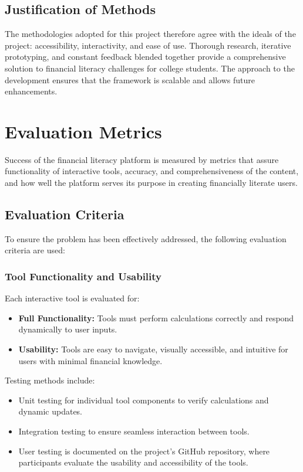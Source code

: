 \documentclass[11pt,twocolumn]{article}
\begin{document}
\subsection{Justification of Methods}
The methodologies adopted for this project therefore agree with the ideals of the project: accessibility, interactivity, and ease of use. Thorough research, iterative prototyping, and constant feedback blended together provide a comprehensive solution to financial literacy challenges for college students. The approach to the development ensures that the framework is scalable and allows future enhancements.


\section{Evaluation Metrics}

Success of the financial literacy platform is measured by metrics that assure functionality of interactive tools, accuracy, and comprehensiveness of the content, and how well the platform serves its purpose in creating financially literate users.

\subsection{Evaluation Criteria}
To ensure the problem has been effectively addressed, the following evaluation criteria are used:

\subsubsection{Tool Functionality and Usability}
Each interactive tool is evaluated for:
\begin{itemize}
    \item \textbf{Full Functionality:} Tools must perform calculations correctly and respond dynamically to user inputs.
    \item \textbf{Usability:} Tools are easy to navigate, visually accessible, and intuitive for users with minimal financial knowledge. 
\end{itemize}

Testing methods include:
\begin{itemize}
    \item Unit testing for individual tool components to verify calculations and dynamic updates.
    \item Integration testing to ensure seamless interaction between tools.
    \item User testing is documented on the project’s GitHub repository, where participants evaluate the usability and accessibility of the tools.
\end{itemize}
\end{document}
